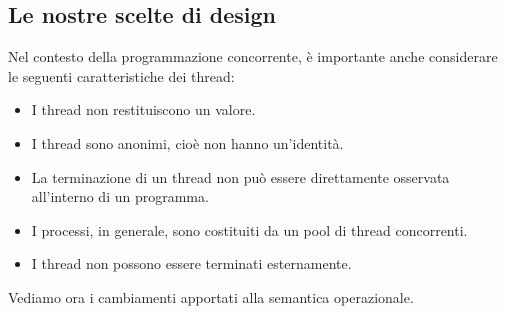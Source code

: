 \subsection{Le nostre scelte di design}
Nel contesto della programmazione concorrente, è importante anche considerare
le seguenti caratteristiche dei thread:
\begin{itemize}
    \item I thread non restituiscono un valore.
    \item I thread sono anonimi, cioè non hanno un'identità.
    \item La terminazione di un thread non può essere direttamente osservata all'interno di un programma.
    \item I processi, in generale, sono costituiti da un pool di thread concorrenti.
    \item I thread non possono essere terminati esternamente.
\end{itemize}
Vediamo ora i cambiamenti apportati alla semantica operazionale.
\begin{prooftree}
\end{prooftree}
\begin{prooftree}
\end{prooftree}
\begin{prooftree}
\end{prooftree}
\begin{prooftree}
\end{prooftree}
\begin{prooftree}
\end{prooftree}
